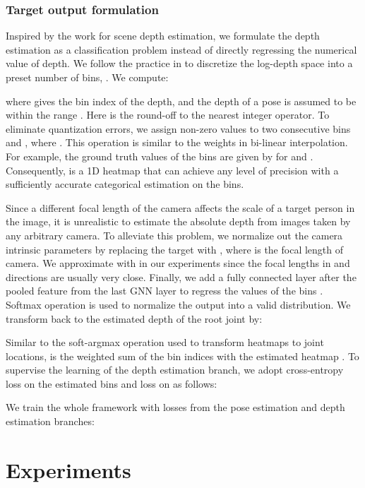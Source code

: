 \documentclass[runningheads]{llncs}
\begin{document}
\subsubsection{Target output formulation}
Inspired by the work \cite{fu2018deep} for scene depth estimation,
we formulate the depth estimation as a classification problem
instead of directly regressing the numerical value of depth.
We follow the practice in \cite{fu2018deep} to discretize the log-depth space into a preset number of bins, . We compute:

where  gives the bin index of the depth, and the depth  of a pose is assumed to be within the range . Here  is the round-off to the nearest integer operator. 
To eliminate quantization errors, we assign non-zero values to two consecutive bins  and , where . This operation is similar to the weights in bi-linear interpolation. For example, the ground truth values of the bins are given by  for  and .
Consequently,  is a 1D heatmap that can achieve any level of precision with a sufficiently accurate categorical estimation on the bins.

Since a different focal length of the camera affects the scale of a target person in the image, it is unrealistic to estimate the absolute depth from images taken by any arbitrary camera. To alleviate this problem, we normalize out the camera intrinsic parameters by replacing the target  with , where  is the focal length of camera. We approximate with  in our experiments since the focal lengths in  and  directions are usually very close.
Finally, we add a fully connected layer after the pooled feature from the last GNN layer to regress the  values of the bins . Softmax operation is used to normalize the output into a valid distribution. We transform  back to the estimated depth  of the root joint by:

Similar to the soft-argmax operation used to transform heatmaps to joint locations,  is the weighted sum of the bin indices with the estimated heatmap .
To supervise the learning of the depth estimation branch, we adopt cross-entropy loss on the estimated bins  and  loss on  as follows:

We train the whole framework with losses from the pose estimation and depth estimation branches:



\section{Experiments}
\end{document}
